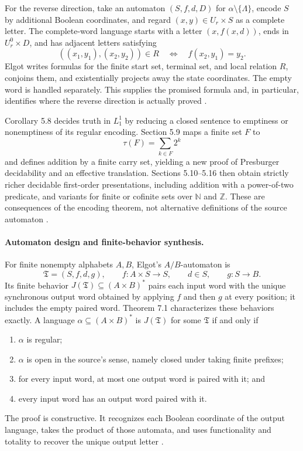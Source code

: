 For the reverse direction, take an automaton \((S,f,d,D)\) for
\(\alpha\setminus\{\Lambda\}\), encode \(S\) by additional Boolean
coordinates, and regard \((x,y)\in U_r\times S\) as a complete letter.  The
complete-word language starts with a letter
\((x,f(x,d))\), ends in \(U_r^0\times D\), and has adjacent letters satisfying
\[
 ((x_1,y_1),(x_2,y_2))\in R
 \quad\Longleftrightarrow\quad
 f(x_2,y_1)=y_2.
\]
Elgot writes formulas for the finite start set, terminal set, and local
relation \(R\), conjoins them, and existentially projects away the state
coordinates.  The empty word is handled separately.  This supplies the
promised formula and, in particular, identifies where the reverse direction is
actually proved \cite[pp.~30--31]{Elgot1961}.

Corollary 5.8 decides truth in \(L_1^1\) by reducing a closed sentence to
emptiness or nonemptiness of its regular encoding.  Section 5.9 maps a finite
set \(F\) to
\[
 \tau(F)=\sum_{k\in F}2^k
\]
and defines addition by a finite carry set, yielding a new proof of Presburger
decidability and an effective translation.  Sections 5.10--5.16 then obtain
strictly richer decidable first-order presentations, including addition with a
power-of-two predicate, and variants for finite or cofinite sets over
\(\mathbb N\) and \(\mathbb Z\).  These are consequences of the encoding
theorem, not alternative definitions of the source automaton
\cite[pp.~31--37]{Elgot1961}.

\paragraph{Automaton design and finite-behavior synthesis.}
For finite nonempty alphabets \(A,B\), Elgot's \(A/B\)-automaton is
\[
 \mathfrak T=(S,f,d,g),
 \qquad
 f:A\times S\longrightarrow S,
 \qquad
 d\in S,
 \qquad
 g:S\longrightarrow B.
\]
Its finite behavior \(J(\mathfrak T)\subseteq (A\times B)^*\) pairs each input
word with the unique synchronous output word obtained by applying \(f\) and
then \(g\) at every position; it includes the empty paired word.  Theorem 7.1
characterizes these behaviors exactly.  A language
\(\alpha\subseteq(A\times B)^*\) is \(J(\mathfrak T)\) for some
\(\mathfrak T\) if and only if
\begin{enumerate}
\item \(\alpha\) is regular;
\item \(\alpha\) is open in the source's sense, namely closed under taking
  finite prefixes;
\item for every input word, at most one output word is paired with it; and
\item every input word has an output word paired with it.
\end{enumerate}
The proof is constructive.  It recognizes each Boolean coordinate of the
output language, takes the product of those automata, and uses functionality
and totality to recover the unique output letter
\cite[pp.~40--43]{Elgot1961}.

